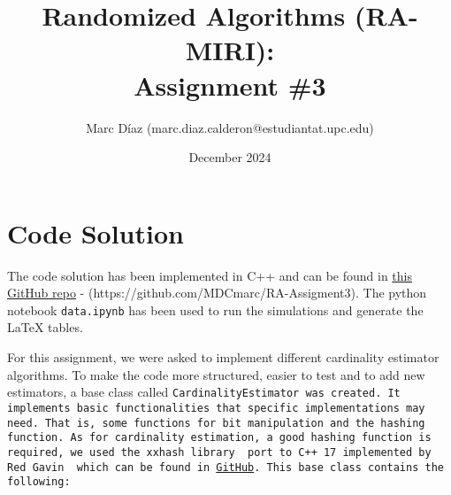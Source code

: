 \documentclass[a4paper, 11pt]{article}
\title{Randomized Algorithms (RA-MIRI): \\
        Assignment \#3
        }
\author{%
    Marc Díaz (marc.diaz.calderon@estudiantat.upc.edu) 
}
\date{December 2024}
\begin{document}
\maketitle

\section{Code Solution}
The code solution has been implemented in C++ and can be found in \href{https://github.com/MDCmarc/RA-Assigment3}{this GitHub repo} - (https://github.com/MDCmarc/RA-Assigment3). The python notebook \texttt{data.ipynb} has been used to run the simulations and generate the LaTeX tables.

For this assignment, we were asked to implement different cardinality estimator algorithms. To make the code more structured, easier to test and to add new estimators, a base class called \tt{CardinalityEstimator} was created. It implements basic functionalities that specific implementations may need. That is, some functions for bit manipulation and the hashing function. As for cardinality estimation, a good hashing function is required, we used the \tt{xxhash} library \cite{xxHash} port to \tt{C++ 17} implemented by Red Gavin \cite{xxHashPort} which can be found in \href{https://github.com/RedSpah/xxhash_cpp}{GitHub}. This base class contains the following:
\end{document}
